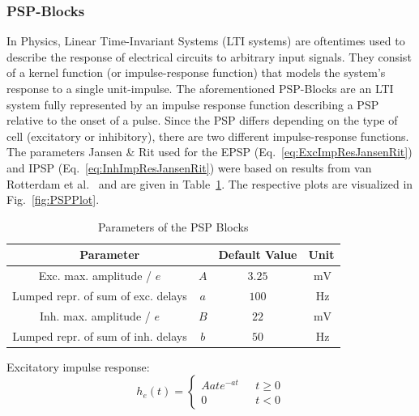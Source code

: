 \subsubsection{PSP-Blocks}
In Physics, Linear Time-Invariant Systems (LTI systems) are oftentimes used to describe the response of
electrical circuits to arbitrary input signals.
They consist of a kernel function (or impulse-response function)
that models the system's response to a single unit-impulse.
The aforementioned PSP-Blocks are an LTI system fully represented by an impulse response function describing a PSP
relative to the onset of a pulse.
Since the PSP differs depending on the type of cell (excitatory or inhibitory),
there are two different impulse-response functions.
The parameters Jansen \& Rit used for the EPSP (Eq.~\ref{eq:ExcImpResJansenRit}) and IPSP (Eq.~\ref{eq:InhImpResJansenRit})
were based on results from van Rotterdam et al.~\cite{van_rotterdam_model_1982} and are given in Table~\ref{tab:psp_params}.
The respective plots are visualized in Fig.~\ref{fig:PSPPlot}.
\begin{table}[H]
    \centering
    \begin{tabular}{ |c|c|c|c| }
        \hline
        \multicolumn{2}{|c|}{Parameter} & Default Value & Unit \\
        \hline
        \hline
        Exc. max. amplitude / $e$          & \(A\) & \(3.25\) & \(\SI{}{\milli\volt}\) \\
        \hline
        Lumped repr. of sum of exc. delays & \(a\) & \(100\)  & \(\SI{}{\hertz}\) \\
        \hline
        Inh. max. amplitude / $e$          & \(B\) & \(22\)   & \(\SI{}{\milli\volt}\) \\
        \hline
        Lumped repr. of sum of inh. delays & \(b\) & \(50\)   & \(\SI{}{\hertz}\) \\
        \hline
    \end{tabular}
    \caption{Parameters of the PSP Blocks}
    \label{tab:psp_params}
\end{table}

Excitatory impulse response:
\begin{equation}
    h_e(t) = \begin{cases}
                 Aate^{-at} & \mbox{ } t \geq 0 \\
                 0 & \mbox{ } t < 0
    \end{cases} \label{eq:ExcImpResJansenRit}
\end{equation}

